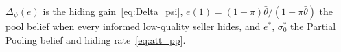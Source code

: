 $\Delta_\psi(e)$ is the hiding gain~\eqref{eq:Delta_psi}, $e(1)=(1-\pi)\bar\theta/(1-\pi\bar\theta)$ the pool belief when every informed low-quality seller hides, and $e^*$, $\sigma_0^*$ the Partial Pooling belief and hiding rate~\eqref{eq:att_pp}.
